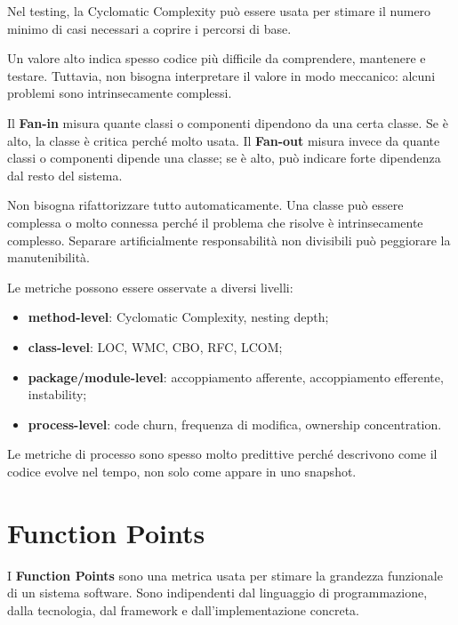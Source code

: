 \begin{notaslide}
Nel testing, la Cyclomatic Complexity può essere usata per stimare il numero minimo di casi necessari a coprire i percorsi di base.
\end{notaslide}

Un valore alto indica spesso codice più difficile da comprendere, mantenere e testare. Tuttavia, non bisogna interpretare il valore in modo meccanico: alcuni problemi sono intrinsecamente complessi.

Il \textbf{Fan-in} misura quante classi o componenti dipendono da una certa classe. Se è alto, la classe è critica perché molto usata. Il \textbf{Fan-out} misura invece da quante classi o componenti dipende una classe; se è alto, può indicare forte dipendenza dal resto del sistema.

\begin{notaprof}
Non bisogna rifattorizzare tutto automaticamente. Una classe può essere complessa o molto connessa perché il problema che risolve è intrinsecamente complesso. Separare artificialmente responsabilità non divisibili può peggiorare la manutenibilità.
\end{notaprof}

Le metriche possono essere osservate a diversi livelli:

\begin{itemize}
    \item \textbf{method-level}: Cyclomatic Complexity, nesting depth;
    \item \textbf{class-level}: LOC, WMC, CBO, RFC, LCOM;
    \item \textbf{package/module-level}: accoppiamento afferente, accoppiamento efferente, instability;
    \item \textbf{process-level}: code churn, frequenza di modifica, ownership concentration.
\end{itemize}

Le metriche di processo sono spesso molto predittive perché descrivono come il codice evolve nel tempo, non solo come appare in uno snapshot.

\section{Function Points}

I \textbf{Function Points} sono una metrica usata per stimare la grandezza funzionale di un sistema software. Sono indipendenti dal linguaggio di programmazione, dalla tecnologia, dal framework e dall'implementazione concreta.

